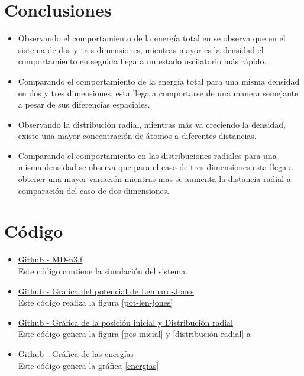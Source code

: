 \documentclass[reprint,amsmath,amssymb,aps,]{revtex4-2}
\begin{document}
\section{Conclusiones}
\begin{itemize}
    \item Observando el comportamiento de la energía total en se observa que en el sistema de dos y tres dimensiones, mientras mayor es la densidad el comportamiento en seguida llega a un estado oscilatorio más rápido.
    \item Comparando el comportamiento de la energía total para una misma densidad en dos y tres dimensiones, esta llega a comportarse de una manera semejante a pesar de sus diferencias espaciales.
    \item Observando la distribución  radial, mientras más va creciendo la densidad, existe una mayor concentración de átomos a diferentes distancias.
    \item Comparando el comportamiento en las distribuciones radiales para una misma densidad se observa que para el caso de tres dimensiones esta llega a obtener una mayor variación mientras mas se aumenta la distancia radial a comparación del caso de dos dimensiones.
\end{itemize}
\section{Código}
\begin{itemize}
\item \href{https://github.com/giovannilopez9808/Notas_Agosto_2020/blob/master/Simulaciones/Proyecto_1/Scripts/MD-n3.f}{Github - MD-n3.f}\\
Este código contiene la simulación del sistema.
\item \href{https://github.com/giovannilopez9808/Notas_Agosto_2020/blob/master/Simulaciones/Proyecto_1/Scripts/Potencial_Graphics.py}{Github - Gráfica del potencial de Lennard-Jones}\\
Este código realiza la figura \ref{pot-len-jones}
\item \href{https://github.com/giovannilopez9808/Notas_Agosto_2020/blob/master/Simulaciones/Proyecto_1/Scripts/Cor_Graphics.py}{Github - Gráfica de la posición inicial y Distribución radial}\\
Este código genera la figura \ref{pos inicial} y \ref{distribución radial} a
\item \href{https://github.com/giovannilopez9808/Notas_Agosto_2020/blob/master/Simulaciones/Proyecto_1/Scripts/Energy_Graphics.py}{Github - Gráfica de las energías}\\
Este código genera la gráfica \ref{energias}
\end{itemize}

\nocite{*}

\end{document}
